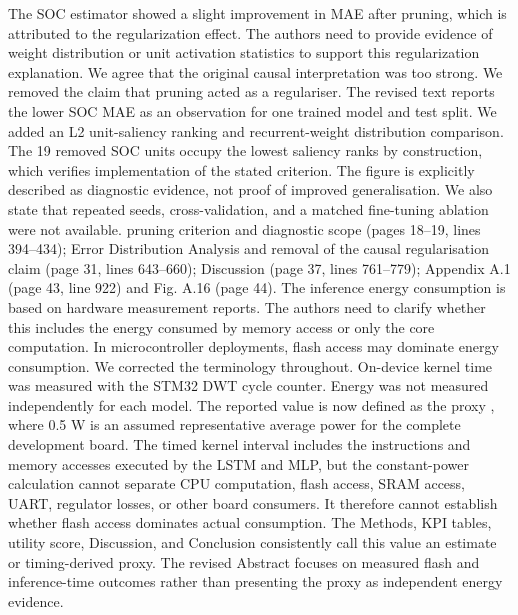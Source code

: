 {}
\markdownRendererSectionEnd \markdownRendererSectionBegin
{}\markdownRendererInterblockSeparator
{}\markdownRendererBlockQuoteBegin
The SOC estimator showed a slight improvement in MAE after pruning, which is attributed to the regularization effect. The authors need to provide evidence of weight distribution or unit activation statistics to support this regularization explanation.\markdownRendererBlockQuoteEnd \markdownRendererInterblockSeparator
{} We agree that the original causal interpretation was too strong. We removed the claim that pruning acted as a regulariser. The revised text reports the lower SOC MAE as an observation for one trained model and test split. We added an L2 unit-saliency ranking and recurrent-weight distribution comparison. The 19 removed SOC units occupy the lowest saliency ranks by construction, which verifies implementation of the stated criterion. The figure is explicitly described as diagnostic evidence, not proof of improved generalisation. We also state that repeated seeds, cross-validation, and a matched fine-tuning ablation were not available.\markdownRendererParagraphSeparator
{} pruning criterion and diagnostic scope (pages 18--19, lines 394--434); Error Distribution Analysis and removal of the causal regularisation claim (page 31, lines 643--660); Discussion (page 37, lines 761--779); Appendix A.1 (page 43, line 922) and Fig. A.16 (page 44).\markdownRendererInterblockSeparator
{}
\markdownRendererSectionEnd \markdownRendererSectionBegin
{}\markdownRendererInterblockSeparator
{}\markdownRendererBlockQuoteBegin
The inference energy consumption is based on hardware measurement reports. The authors need to clarify whether this includes the energy consumed by memory access or only the core computation. In microcontroller deployments, flash access may dominate energy consumption.\markdownRendererBlockQuoteEnd \markdownRendererInterblockSeparator
{} We corrected the terminology throughout. On-device kernel time was measured with the STM32 DWT cycle counter. Energy was not measured independently for each model. The reported value is now defined as the proxy , where 0.5 W is an assumed representative average power for the complete development board. The timed kernel interval includes the instructions and memory accesses executed by the LSTM and MLP, but the constant-power calculation cannot separate CPU computation, flash access, SRAM access, UART, regulator losses, or other board consumers. It therefore cannot establish whether flash access dominates actual consumption. The Methods, KPI tables, utility score, Discussion, and Conclusion consistently call this value an estimate or timing-derived proxy. The revised Abstract focuses on measured flash and inference-time outcomes rather than presenting the proxy as independent energy evidence.\markdownRendererParagraphSeparator
